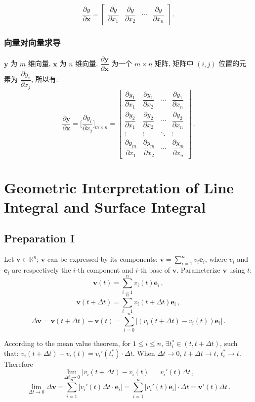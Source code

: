 \documentclass[UTF8]{ctexart}
\newcommand{\ve}[1]{\boldsymbol{\mathbf{#1}}}
\newcommand{\R}{\mathbb R}
\begin{document}
\[ \dfrac{\partial y}{\partial \ve{x}} = \begin{bmatrix}
    \dfrac{\partial y}{\partial x_1} & \dfrac{\partial y}{\partial x_2} & \cdots & \dfrac{\partial y}{\partial x_n}
\end{bmatrix} \,.\]

\subsubsection{向量对向量求导}
$ \ve{y} $ 为 $ m $ 维向量, $ \ve{x} $ 为 $ n $ 维向量, $ \dfrac{\partial \ve{y}}{\partial \ve{x}} $ 为一个 $ m \times n $ 矩阵, 矩阵中 $ (i, j) $ 位置的元素为 $ \dfrac{\partial y_i}{\partial x_j} $, 所以有: 
\[ \dfrac{\partial \ve{y}}{\partial \ve{x}} = \Big[ \dfrac{\partial y_i}{\partial x_j} \Big]_{m \times n} = \begin{bmatrix}
    \dfrac{\partial y_1}{\partial x_1} & \dfrac{\partial y_1}{\partial x_2} & \cdots & \dfrac{\partial y_1}{\partial x_n} \\
    \dfrac{\partial y_2}{\partial x_1} & \dfrac{\partial y_2}{\partial x_2} & \cdots & \dfrac{\partial y_2}{\partial x_n} \\
    \vdots & \vdots & \ddots & \vdots \\
    \dfrac{\partial y_m}{\partial x_1} & \dfrac{\partial y_m}{\partial x_2} & \cdots & \dfrac{\partial y_m}{\partial x_n} 
\end{bmatrix} \,.\]





\section{Geometric Interpretation of Line Integral and Surface Integral}
\subsection{Preparation I}
Let $ \ve v \in \R^n $; $ \ve v $ can be expressed by its components: $\displaystyle \ve v = \sum_{i = 1}^n v_i \ve e_i $, where $ v_i $ and $ \ve e_i $ are respectively the $ i $-th component and $ i $-th base of $ \ve v $. Parameterize $ \ve v $ using $ t $:
\[ \ve v(t) = \sum_{i=1}^n v_i(t) \ve e_i \,,\]
\[ \ve v(t + \Delta t) = \sum_{i=1}^n v_i(t + \Delta t) \ve e_i \,,\]
\[ \Delta \ve v = \ve v(t + \Delta t) - \ve v(t) = \sum_{i=0}^{n} \big[ (v_i(t + \Delta t) - v_i(t)) \ve e_i \big] \,.\]

According to the mean value theorem, for $ 1 \leqslant i \leqslant n $, $ \exists t_i^* \in (t, t + \Delta t) $, such that: $ v_i (t + \Delta t) - v_i (t) = v_i'(t_i^*) \cdot \Delta t $. When $ \Delta t \to 0 $, $ t + \Delta t \to t $, $ t_i^* \to t $. Therefore
\[ \lim_{\Delta t \to 0} \big[  v_i (t + \Delta t) - v_i (t) \big] = v_i'(t) \Delta t \,,\]
\[ \lim_{\Delta t \to 0} \Delta \ve v = \sum_{i = 1}^n \big[ v_i'(t) \Delta t \cdot \ve e_i \big] = \sum_{i = 1}^n \big[ v_i'(t) \ve e_i \big]\cdot \Delta t = \ve v'(t) \Delta t \,. \tag{$ * $}\]
\end{document}
